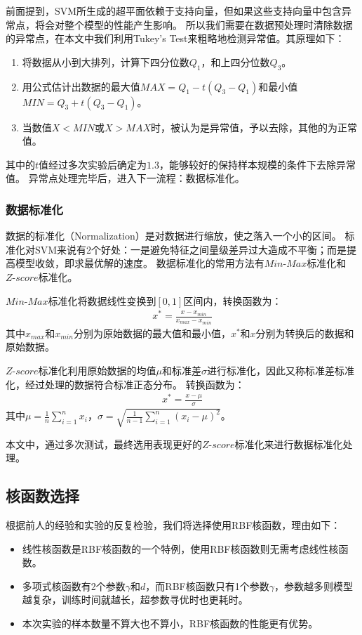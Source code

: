 前面提到，SVM所生成的超平面依赖于支持向量，但如果这些支持向量中包含异常点，将会对整个模型的性能产生影响。
所以我们需要在数据预处理时清除数据的异常点，在本文中我们利用Tukey's Test来粗略地检测异常值。其原理如下：
\begin{enumerate}
    \item 将数据从小到大排列，计算下四分位数$Q_1$，和上四分位数$Q_3$。
    \item 用公式估计出数据的最大值$MAX=Q_1-t(Q_3-Q_1)$和最小值$MIN=Q_3+t(Q_3-Q_1)$。
    \item 当数值$X<MIN$或$X>MAX$时，被认为是异常值，予以去除，其他的为正常值。
\end{enumerate}

其中的$t$值经过多次实验后确定为$1.3$，能够较好的保持样本规模的条件下去除异常值。
异常点处理完毕后，进入下一流程：数据标准化。

\subsubsection{数据标准化}

数据的标准化（Normalization）是对数据进行缩放，使之落入一个小的区间。
标准化对SVM来说有2个好处：一是避免特征之间量级差异过大造成不平衡；而是提高模型收敛，即求最优解的速度。
数据标准化的常用方法有$Min\text{-}Max$标准化和$Z\text{-}score$标准化。

$Min\text{-}Max$标准化将数据线性变换到$[0,1]$区间内，转换函数为：
\begin{align}
    x^*=\frac{x-x_{min}}{x_{max}-x_{min}}
\end{align}
其中$x_{max}$和$x_{min}$分别为原始数据的最大值和最小值，$x^*$和$x$分别为转换后的数据和原始数据。

$Z\text{-}score$标准化利用原始数据的均值$\mu$和标准差$\sigma$进行标准化，因此又称标准差标准化，经过处理的数据符合标准正态分布。
转换函数为：
\begin{align}
    x^*=\frac{x-\mu}{\sigma}
\end{align}
其中$\mu=\frac{1}{n}\sum_{i=1}^nx_i$，$\sigma=\sqrt{\frac{1}{n-1}\sum_{i=1}^n(x_i-\mu)^2}$。

本文中，通过多次测试，最终选用表现更好的$Z\text{-}score$标准化来进行数据标准化处理。

\subsection{核函数选择}

根据前人的经验和实验的反复检验，我们将选择使用RBF核函数，理由如下：
\begin{itemize}
    \item 线性核函数是RBF核函数的一个特例，使用RBF核函数则无需考虑线性核函数。
    \item 多项式核函数有2个参数$\gamma$和$d$，而RBF核函数只有1个参数$\gamma$，参数越多则模型越复杂，训练时间就越长，超参数寻优时也更耗时。
    \item 本次实验的样本数量不算大也不算小，RBF核函数的性能更有优势。
\end{itemize}

